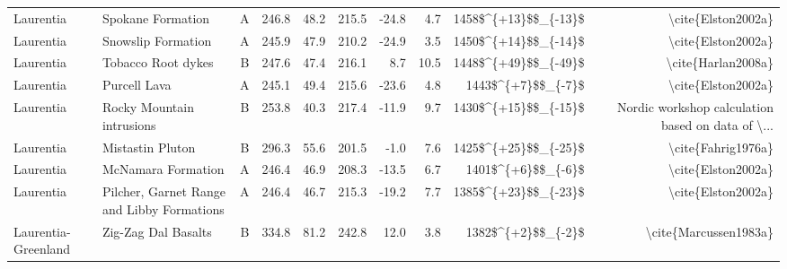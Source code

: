 \begin{longtable}{p{1 in}p{1 in}rrrrrrrr}
                     Laurentia &                                Spokane Formation &      A &     246.8 &      48.2 & 215.5 & -24.8 &       4.7 &   1458\$\textasciicircum \{+13\}\$\$\_\{-13\}\$ &                                 \textbackslash cite\{Elston2002a\} \\
                     Laurentia &                               Snowslip Formation &      A &     245.9 &      47.9 & 210.2 & -24.9 &       3.5 &   1450\$\textasciicircum \{+14\}\$\$\_\{-14\}\$ &                                 \textbackslash cite\{Elston2002a\} \\
                     Laurentia &                               Tobacco Root dykes &      B &     247.6 &      47.4 & 216.1 &   8.7 &      10.5 &   1448\$\textasciicircum \{+49\}\$\$\_\{-49\}\$ &                                 \textbackslash cite\{Harlan2008a\} \\
                     Laurentia &                                     Purcell Lava &      A &     245.1 &      49.4 & 215.6 & -23.6 &       4.8 &     1443\$\textasciicircum \{+7\}\$\$\_\{-7\}\$ &                                 \textbackslash cite\{Elston2002a\} \\
                     Laurentia &                        Rocky Mountain intrusions &      B &     253.8 &      40.3 & 217.4 & -11.9 &       9.7 &   1430\$\textasciicircum \{+15\}\$\$\_\{-15\}\$ &  Nordic workshop calculation based on data of \textbackslash ... \\
                     Laurentia &                                 Mistastin Pluton &      B &     296.3 &      55.6 & 201.5 &  -1.0 &       7.6 &   1425\$\textasciicircum \{+25\}\$\$\_\{-25\}\$ &                                 \textbackslash cite\{Fahrig1976a\} \\
                     Laurentia &                               McNamara Formation &      A &     246.4 &      46.9 & 208.3 & -13.5 &       6.7 &     1401\$\textasciicircum \{+6\}\$\$\_\{-6\}\$ &                                 \textbackslash cite\{Elston2002a\} \\
                     Laurentia &       Pilcher, Garnet Range and Libby Formations &      A &     246.4 &      46.7 & 215.3 & -19.2 &       7.7 &   1385\$\textasciicircum \{+23\}\$\$\_\{-23\}\$ &                                 \textbackslash cite\{Elston2002a\} \\
           Laurentia-Greenland &                              Zig-Zag Dal Basalts &      B &     334.8 &      81.2 & 242.8 &  12.0 &       3.8 &     1382\$\textasciicircum \{+2\}\$\$\_\{-2\}\$ &                              \textbackslash cite\{Marcussen1983a\} \\

\end{longtable}

